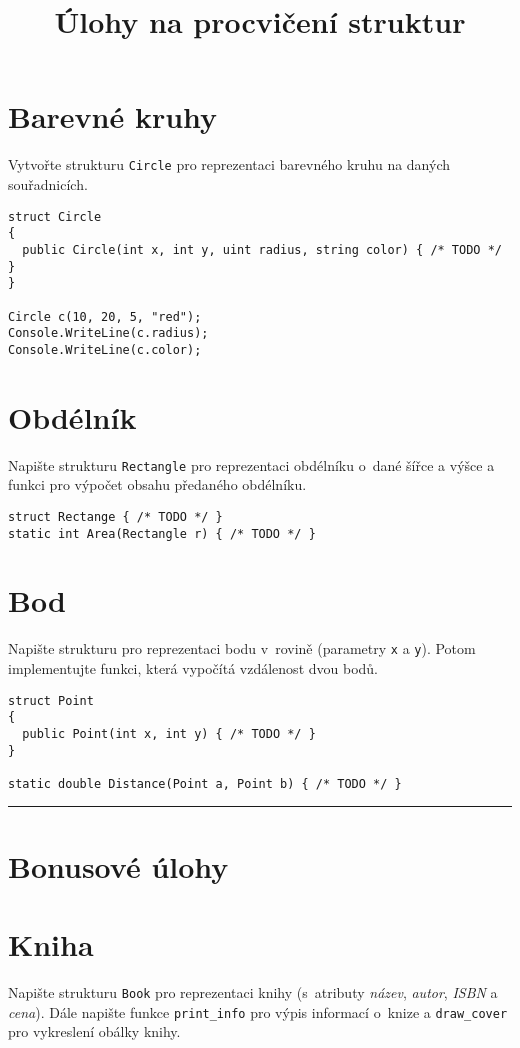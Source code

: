 \documentclass[12pt,a4paper]{article}
\begin{document}
\pagestyle{empty}
\title{Úlohy na procvičení struktur}
\date{\vspace{-12ex}}
\setlength{\droptitle}{-6em}
\maketitle

\section{Barevné kruhy}

Vytvořte strukturu \texttt{Circle} pro reprezentaci barevného kruhu na daných
souřadnicích.

\begin{verbatim}
struct Circle
{
  public Circle(int x, int y, uint radius, string color) { /* TODO */ }
}

Circle c(10, 20, 5, "red");
Console.WriteLine(c.radius);
Console.WriteLine(c.color);
\end{verbatim}


\section{Obdélník}

Napište strukturu \texttt{Rectangle} pro reprezentaci obdélníku o dané šířce a
výšce a funkci pro výpočet obsahu předaného obdélníku.

\begin{verbatim}
struct Rectange { /* TODO */ }
static int Area(Rectangle r) { /* TODO */ }
\end{verbatim}


\section{Bod}

Napište strukturu pro reprezentaci bodu v rovině (parametry \texttt{x} a
\texttt{y}). Potom implementujte funkci, která vypočítá vzdálenost dvou bodů.

\begin{verbatim}
struct Point
{
  public Point(int x, int y) { /* TODO */ }
}

static double Distance(Point a, Point b) { /* TODO */ }
\end{verbatim}


\noindent\rule{\textwidth}{1pt}
\section*{Bonusové úlohy}

\section{Kniha}

Napište strukturu \texttt{Book} pro reprezentaci knihy (s atributy
\textit{název}, \textit{autor}, \textit{ISBN} a \textit{cena}).  Dále napište
funkce \texttt{print\_info} pro výpis informací o knize a \texttt{draw\_cover}
pro vykreslení obálky knihy.
\end{document}

